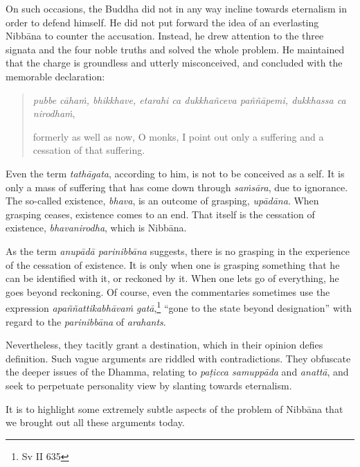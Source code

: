 On such occasions, the Buddha did not in any way incline towards eternalism in order to defend himself. He did not put forward the idea of an everlasting Nibbāna to counter the accusation. Instead, he drew attention to the three signata and the four noble truths and solved the whole problem. He maintained that the charge is groundless and utterly misconceived, and concluded with the memorable declaration:

\begin{quote}
\emph{pubbe cāhaṁ, bhikkhave, etarahi ca dukkhañceva paññāpemi, dukkhassa ca nirodhaṁ},

formerly as well as now, O monks, I point out only a suffering and a cessation of that suffering.
\end{quote}

Even the term \emph{tathāgata}, according to him, is not to be conceived as a self. It is only a mass of suffering that has come down through \emph{saṁsāra}, due to ignorance. The so-called existence, \emph{bhava}, is an outcome of grasping, \emph{upādāna}. When grasping ceases, existence comes to an end. That itself is the cessation of existence, \emph{bhavanirodha}, which is Nibbāna.

As the term \emph{anupādā parinibbāna} suggests, there is no grasping in the experience of the cessation of existence. It is only when one is grasping something that he can be identified with it, or reckoned by it. When one lets go of everything, he goes beyond reckoning. Of course, even the commentaries sometimes use the expression \emph{apaññattikabhāvaṁ gatā},\footnote{Sv II 635} ``gone to the state beyond designation'' with regard to the \emph{parinibbāna} of \emph{arahants}.

Nevertheless, they tacitly grant a destination, which in their opinion defies definition. Such vague arguments are riddled with contradictions. They obfuscate the deeper issues of the Dhamma, relating to \emph{paṭicca samuppāda} and \emph{anattā}, and seek to perpetuate personality view by slanting towards eternalism.

It is to highlight some extremely subtle aspects of the problem of Nibbāna that we brought out all these arguments today.
